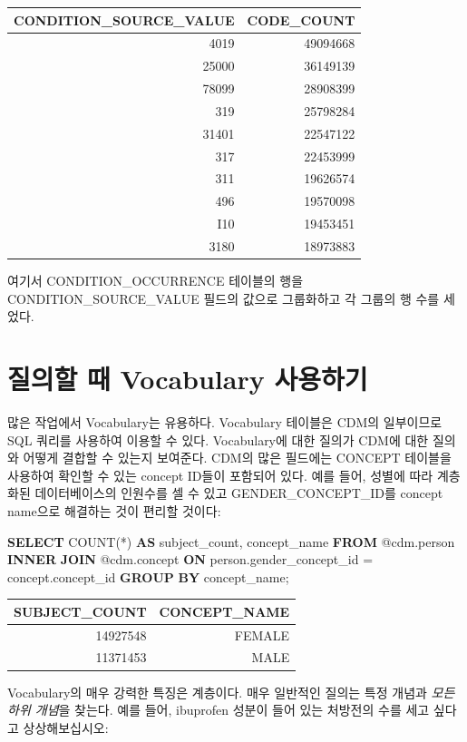 \documentclass[11pt]{book}
\newenvironment{Shaded}{\begin{snugshade}}{\end{snugshade}}
\newcommand{\KeywordTok}[1]{\textcolor[rgb]{0.13,0.29,0.53}{\textbf{#1}}}
\newcommand{\FunctionTok}[1]{\textcolor[rgb]{0.00,0.00,0.00}{#1}}
\newcommand{\NormalTok}[1]{#1}
\theoremstyle{definition}
\theoremstyle{definition}
\theoremstyle{definition}
\theoremstyle{remark}
\begin{document}
\begin{longtable}[]{@{}rr@{}}
\toprule
CONDITION\_SOURCE\_VALUE & CODE\_COUNT\tabularnewline
\midrule
\endhead
4019 & 49094668\tabularnewline
25000 & 36149139\tabularnewline
78099 & 28908399\tabularnewline
319 & 25798284\tabularnewline
31401 & 22547122\tabularnewline
317 & 22453999\tabularnewline
311 & 19626574\tabularnewline
496 & 19570098\tabularnewline
I10 & 19453451\tabularnewline
3180 & 18973883\tabularnewline
\bottomrule
\end{longtable}

여기서 CONDITION\_OCCURRENCE 테이블의 행을 CONDITION\_SOURCE\_VALUE
필드의 값으로 그룹화하고 각 그룹의 행 수를 세었다.

\section{질의할 때 Vocabulary 사용하기}\label{--vocabulary-}

많은 작업에서 Vocabulary는 유용하다. Vocabulary 테이블은 CDM의
일부이므로 SQL 쿼리를 사용하여 이용할 수 있다. Vocabulary에 대한 질의가
CDM에 대한 질의와 어떻게 결합할 수 있는지 보여준다. CDM의 많은 필드에는
CONCEPT 테이블을 사용하여 확인할 수 있는 concept ID들이 포함되어 있다.
예를 들어, 성별에 따라 계층화된 데이터베이스의 인원수를 셀 수 있고
GENDER\_CONCEPT\_ID를 concept name으로 해결하는 것이 편리할 것이다:

\begin{Shaded}
\begin{Highlighting}[]
\KeywordTok{SELECT} \FunctionTok{COUNT}\NormalTok{(*) }\KeywordTok{AS}\NormalTok{ subject_count,}
\NormalTok{  concept_name}
\KeywordTok{FROM}\NormalTok{ @cdm.person}
\KeywordTok{INNER} \KeywordTok{JOIN}\NormalTok{ @cdm.concept}
  \KeywordTok{ON}\NormalTok{ person.gender_concept_id = concept.concept_id}
\KeywordTok{GROUP} \KeywordTok{BY}\NormalTok{ concept_name;}
\end{Highlighting}
\end{Shaded}

\begin{longtable}[]{@{}rr@{}}
\toprule
SUBJECT\_COUNT & CONCEPT\_NAME\tabularnewline
\midrule
\endhead
14927548 & FEMALE\tabularnewline
11371453 & MALE\tabularnewline
\bottomrule
\end{longtable}

Vocabulary의 매우 강력한 특징은 계층이다. 매우 일반적인 질의는 특정
개념과 \emph{모든 하위 개념}을 찾는다. 예를 들어, ibuprofen 성분이 들어
있는 처방전의 수를 세고 싶다고 상상해보십시오:
\end{document}
